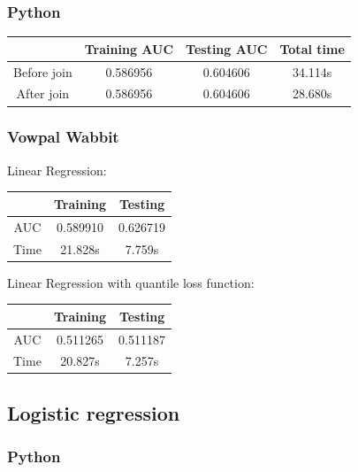 \documentclass[10pt]{article}
\begin{document}
\subsubsection{Python}
\begin{center}
 \begin{tabular}{|c | c | c | c||} 
 \hline
 & Training AUC & Testing AUC & Total time\\ [0.5ex] 
 \hline\hline
Before join & 0.586956 & 0.604606 & 34.114s\\
 \hline
After join & 0.586956 & 0.604606 & 28.680s\\ 
 \hline
\end{tabular}
\end{center}

\subsubsection{Vowpal Wabbit}

Linear Regression:\\

\begin{center}
 \begin{tabular}{|c | c | c||} 
 \hline
 & Training & Testing\\ [0.5ex] 
 \hline\hline
AUC & 0.589910 & 0.626719\\ 
 \hline
Time & 21.828s & 7.759s\\ 
 \hline
\end{tabular}
\end{center}
Linear Regression with quantile loss function:\\

\begin{center}
 \begin{tabular}{|c | c | c||} 
 \hline
 & Training & Testing\\ [0.5ex] 
 \hline\hline
AUC & 0.511265 & 0.511187\\ 
 \hline
Time & 20.827s & 7.257s\\ 
 \hline
\end{tabular}
\end{center}

\subsection{Logistic regression}
\subsubsection{Python}
\end{document}

